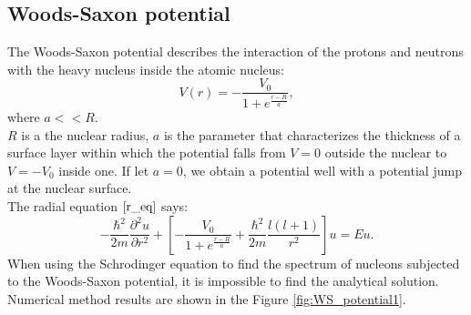 \documentclass[a4paper, 12pt]{article}
\begin{document}
\subsection{Woods-Saxon potential}
The Woods-Saxon potential describes the interaction of the protons and neutrons with the heavy nucleus inside the atomic nucleus:
\begin{equation}
    V(r) = -\frac{V_0}{1+e^\frac{r-R}{a}},
\end{equation}
where $a<<R.$\\ 
$R$ is a the nuclear radius, $a$ is the parameter that characterizes the thickness of a surface layer within which the potential falls from $V=0$ outside the nuclear to  $V = -V_0$ inside one. If let $a=0$, we obtain a potential well with a potential jump at the nuclear surface. \\
The radial equation $\eqref{r_eq}$  says:
$$-\frac{\hbar^2}{2m}\frac{\partial^2 u}{\partial r^2}+[-\frac{V_0}{1+e^\frac{r-R}{a}}+\frac{\hbar^2}{2m}\frac{l(l+1)}{r^2}]u = Eu.$$
When using the Schrodinger equation to find the spectrum of nucleons subjected to the Woods-Saxon potential, it is impossible to find the analytical solution. Numerical method results are shown in the Figure \ref{fig:WS_potential1}.
\end{document}
